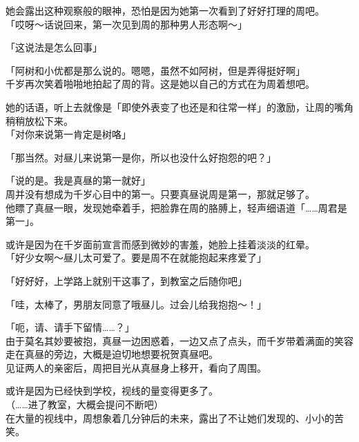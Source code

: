 她会露出这种观察般的眼神，恐怕是因为她第一次看到了好好打理的周吧。\\

「哎呀～话说回来，第一次见到周的那种男人形态啊～」

「这说法是怎么回事」

「阿树和小优都是那么说的。嗯嗯，虽然不如阿树，但是弄得挺好啊」\\

千岁再次笑着啪啪地拍起了周的背。这是她以自己的方式在为周着想吧。

她的话语，听上去就像是「即使外表变了也还是和往常一样」的激励，让周的嘴角稍稍放松下来。\\

「对你来说第一肯定是树咯」

「那当然。对昼儿来说第一是你，所以也没什么好抱怨的吧？」

「说的是。我是真昼的第一就好」\\

周并没有想成为千岁心目中的第一。只要真昼说周是第一，那就足够了。\\

他瞟了真昼一眼，发现她牵着手，把脸靠在周的胳膊上，轻声细语道「……周君是第一」。

或许是因为在千岁面前宣言而感到微妙的害羞，她脸上挂着淡淡的红晕。\\

「好少女啊～昼儿太可爱了。要是周不在就能抱起来疼爱了」

「好好好，上学路上就别干这事了，到教室之后随你吧」

「哇，太棒了，男朋友同意了哦昼儿。过会儿给我抱抱～！」

「呃，请、请手下留情……？」\\

由于莫名其妙要被抱，真昼一边困惑着，一边又点了点头，而千岁带着满面的笑容走在真昼的旁边，大概是迫切地想要祝贺真昼吧。\\

见证两人的亲密后，周把目光从真昼身上移开，看向了周围。

或许是因为已经快到学校，视线的量变得更多了。\\

（……进了教室，大概会提问不断吧）\\

在大量的视线中，周想象着几分钟后的未来，露出了不让她们发现的、小小的苦笑。
